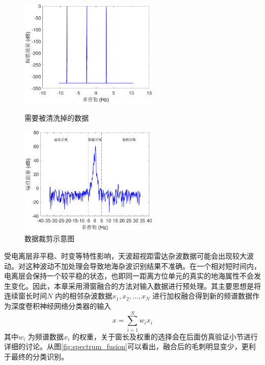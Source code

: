 \begin{figure}[H]
	\centering
	\begin{minipage}{7cm}
		\includegraphics[width=6.67cm]{figures/othr/delete}
		\caption{需要被清洗掉的数据}
		\label{fig:delete}

	\end{minipage}
	\hspace{10pt}
	\begin{minipage}{7cm}
		\includegraphics[width=6.67cm]{figures/othr/cut}
		\caption{数据裁剪示意图}
		\label{fig:cut}

	\end{minipage}

\end{figure}

受电离层非平稳、时变等特性影响，天波超视距雷达杂波数据可能会出现较大波动。对这种波动不加处理会导致地海杂波识别结果不准确。在一个相对短时间内，电离层会保持一个较平稳的状态，也即同一距离方位单元的真实的地海属性不会发生变化。因此，本章采用滑窗融合的方法对输入数据进行预处理。其主要思想是将连续窗长时间$N$ 内的相邻杂波数据$x_1,x_2,\dots,x_N$ 进行加权融合得到新的频谱数据作为深度卷积神经网络分类器的输入
\begin{equation}
	x=\sum_{i=1}^N w_ix_i
	\label{equ:window_fusion}
\end{equation}
其中$w_i$ 为频谱数据$x_i$ 的权重，关于窗长及权重的选择会在后面仿真验证小节进行详细的讨论。从图\ref{fig:spectrum_fusion}可以看出，融合后的毛刺明显变少，更利于最终的分类识别。

